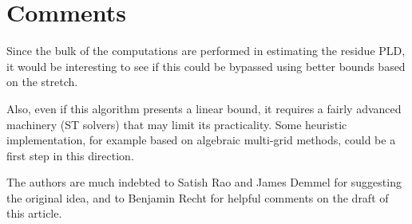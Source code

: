 
\section*{Comments}

Since the bulk of the computations are performed in estimating the
residue PLD, it would be interesting to see if this could be bypassed
using better bounds based on the stretch.

Also, even if this algorithm presents a linear bound, it requires
a fairly advanced machinery (ST solvers) that may limit its practicality.
Some heuristic implementation, for example based on algebraic multi-grid
methods, could be a first step in this direction.

The authors are much indebted to Satish Rao and James Demmel for suggesting
the original idea, and to Benjamin Recht for helpful comments on the draft of this
article.
